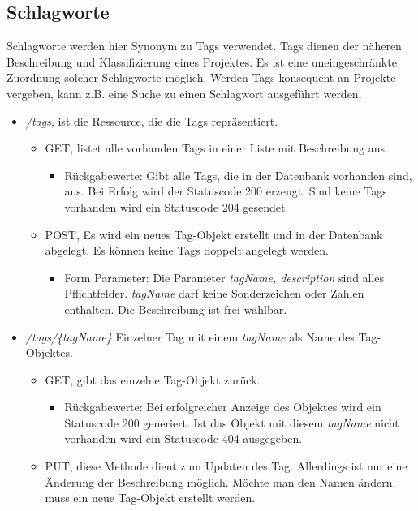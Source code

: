 \documentclass[12pt]{scrartcl}
\begin{document}
\subsection{Schlagworte}
Schlagworte werden hier Synonym zu Tags verwendet.
Tags dienen der näheren Beschreibung und Klassifizierung eines Projektes. Es ist eine uneingeschränkte Zuordnung solcher Schlagworte möglich. Werden Tags konsequent an Projekte vergeben, kann z.B. eine Suche zu einen Schlagwort ausgeführt werden. 
\begin{itemize}
	\item \emph{/tags}, ist die Ressource, die die Tags repräsentiert.
	\begin{itemize}
		\item GET, listet alle vorhanden Tags in einer Liste mit Beschreibung aus.
		\begin{itemize}
			\item Rückgabewerte: Gibt alle Tags, die in der Datenbank vorhanden sind, aus. Bei Erfolg wird der Statuscode 200 erzeugt. Sind keine Tags vorhanden wird ein Statuscode 204 gesendet. 
		\end{itemize}
		\item POST, Es wird ein neues Tag-Objekt erstellt und in der Datenbank abgelegt. Es können keine Tags doppelt angelegt werden.
		\begin{itemize}
			\item Form Parameter: Die Parameter \emph{tagName, description} sind alles Pflichtfelder. \emph{tagName} darf keine Sonderzeichen oder Zahlen enthalten. Die Beschreibung ist frei wählbar. 
		\end{itemize} 
	\end{itemize}
	\item \emph{/tags/\{tagName\}} Einzelner Tag mit einem \emph{tagName} als Name des Tag-Objektes.
	\begin{itemize}
		\item GET, gibt das einzelne Tag-Objekt zurück.
		\begin{itemize}
			\item Rückgabewerte: Bei erfolgreicher Anzeige des Objektes wird ein Statuscode 200 generiert. Ist das Objekt mit diesem \emph{tagName} nicht vorhanden wird ein Statuscode 404 ausgegeben.
		\end{itemize}
		\item PUT, diese Methode dient zum Updaten des Tag. Allerdings ist nur eine Änderung der Beschreibung möglich. Möchte man den Namen ändern, muss ein neue Tag-Objekt erstellt werden.
		\begin{itemize}

\end{itemize}
\end{itemize}
\end{itemize}
\end{document}

